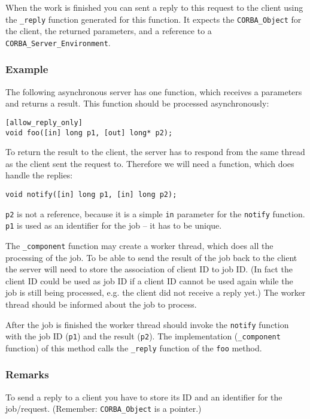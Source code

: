 When the work is finished you can sent a reply to this request to
the client using the \verb|_reply| function generated for this
function. It expects the \verb|CORBA_Object| for the client, the
returned parameters, and a reference to a \verb|CORBA_Server_Environment|.

\subsubsection{Example}
The following asynchronous server has one function, which receives a
parameters and returns a result. This function should be processed
asynchronously:

\begin{verbatim}
[allow_reply_only]
void foo([in] long p1, [out] long* p2);
\end{verbatim}

To return the result to the client, the server has to respond from the same
thread as the client sent the request to. Therefore we will need a
function, which does handle the replies:

\begin{verbatim}
void notify([in] long p1, [in] long p2);
\end{verbatim}

\verb|p2| is not a reference, because it is a simple \verb|in| parameter
for the \verb|notify| function. \verb|p1| is used as an identifier for the
job -- it has to be unique.

The \verb|_component| function may create a worker thread, which does all the
processing of the job. To be able to send the result of the job back to the
client the server will need to store the association of client ID to job ID.
(In fact the client ID could be used as job ID if a client ID cannot be
used again while the job is still being processed, e.g. the client did not
receive a reply yet.) The worker thread should be informed about the job to
process.

After the job is finished the worker thread should invoke the \verb|notify|
function with the job ID (\verb|p1|) and the result (\verb|p2|). The
implementation (\verb|_component| function) of this method calls the \verb|_reply|
function of the \verb|foo| method.

\subsubsection{Remarks}
To send a reply to a client you have to store its ID and an identifier
for the job/request. (Remember: \verb|CORBA_Object| is a pointer.)

